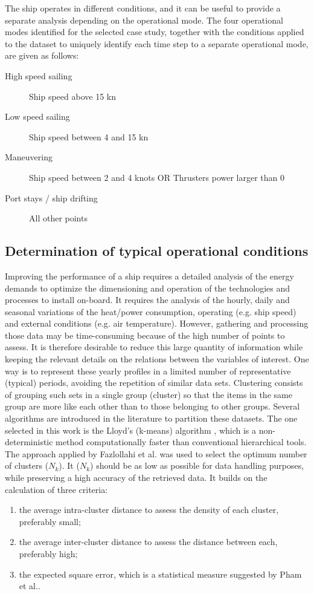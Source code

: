 \documentclass[preprint,12pt]{elsarticle}
\begin{document}
The ship operates in different conditions, and it can be useful to provide a separate analysis depending on the operational mode. The four operational modes identified for the selected case study, together with the conditions applied to the dataset to uniquely identify each time step to a separate operational mode, are given as follows:
\begin{description}
	\item[High speed sailing] Ship speed above 15 kn
	\item[Low speed sailing] Ship speed between 4 and 15 kn
	\item[Maneuvering] Ship speed between 2 and 4 knots OR Thrusters power larger than 0
	\item[Port stays / ship drifting] All other points
\end{description}



\subsection{Determination of typical operational conditions} \label{sec:met:typicalDays}

Improving the performance of a ship requires a detailed analysis of the energy demands to optimize the dimensioning and operation of the technologies and processes to install on-board. It requires the analysis of the hourly, daily and seasonal variations of the heat/power consumption, operating (e.g. ship speed) and external conditions (e.g. air temperature). However, gathering and processing those data may be time-consuming because of the high number of points to assess. It is therefore desirable to reduce this large quantity of information while keeping the relevant details on the relations between the variables of interest. 
One way is to represent these yearly profiles in a limited number of representative (typical) periods, avoiding the repetition of similar data sets. Clustering consists of grouping such sets in a single group (cluster) so that the items in the same group are more like each other than to those belonging to other groups. Several algorithms are introduced in the literature to partition these datasets. The one selected in this work is the Lloyd’s (k-means) algorithm \cite{Kanungo2002}, which is a non-deterministic method computationally faster than conventional hierarchical tools. The approach applied by Fazlollahi et al. \cite{Fazlollah2014} was used to select the optimum number of clusters ($N_k$). It ($N_k$) should be as low as possible for data handling purposes, while preserving a high accuracy of the retrieved data. It builds on the calculation of three criteria: 
\begin{enumerate}
	\item the average intra-cluster distance to assess the density of each cluster, preferably small;
	\item the average inter-cluster distance to assess the distance between each, preferably high; 
	\item the expected square error, which is a statistical measure suggested by Pham et al.. 
\end{enumerate}
\end{document}
